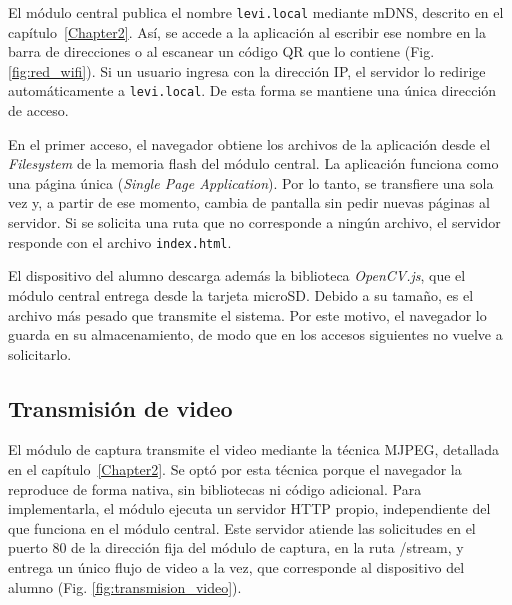 El módulo central publica el nombre \texttt{levi.local} mediante mDNS, descrito en el capítulo~\ref{Chapter2}. Así, se accede a la aplicación al escribir ese nombre en la barra de direcciones o al escanear un código QR que lo contiene (Fig. \ref{fig:red_wifi}). Si un usuario ingresa con la dirección IP, el servidor lo redirige automáticamente a \texttt{levi.local}. De esta forma se mantiene una única dirección de acceso.

En el primer acceso, el navegador obtiene los archivos de la aplicación desde el \emph{Filesystem} de la memoria flash del módulo central. La aplicación funciona como una página única (\emph{Single Page Application}). Por lo tanto, se transfiere una sola vez y, a partir de ese momento, cambia de pantalla sin pedir nuevas páginas al servidor. Si se solicita una ruta que no corresponde a ningún archivo, el servidor responde con el archivo \texttt{index.html}.

El dispositivo del alumno descarga además la biblioteca \emph{OpenCV.js}, que el módulo central entrega desde la tarjeta microSD. Debido a su tamaño, es el archivo más pesado que transmite el sistema. Por este motivo, el navegador lo guarda en su almacenamiento, de modo que en los accesos siguientes no vuelve a solicitarlo.


\subsection{Transmisión de video}
\label{sec:transmision_video}

El módulo de captura transmite el video mediante la técnica MJPEG, detallada en el capítulo~\ref{Chapter2}. Se optó por esta técnica porque el navegador la reproduce de forma nativa, sin bibliotecas ni código adicional. Para implementarla, el módulo ejecuta un servidor HTTP propio, independiente del que funciona en el módulo central. Este servidor atiende las solicitudes en el puerto 80 de la dirección fija del módulo de captura, en la ruta /stream, y entrega un único flujo de video a la vez, que corresponde al dispositivo del alumno (Fig. \ref{fig:transmision_video}).

